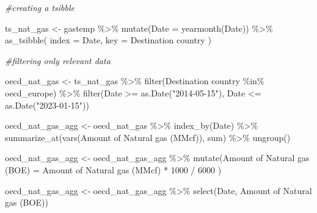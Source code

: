 \documentclass[
]{article}
\newenvironment{Shaded}{\begin{snugshade}}{\end{snugshade}}
\newcommand{\AttributeTok}[1]{\textcolor[rgb]{0.77,0.63,0.00}{#1}}
\newcommand{\CommentTok}[1]{\textcolor[rgb]{0.56,0.35,0.01}{\textit{#1}}}
\newcommand{\DecValTok}[1]{\textcolor[rgb]{0.00,0.00,0.81}{#1}}
\newcommand{\FunctionTok}[1]{\textcolor[rgb]{0.00,0.00,0.00}{#1}}
\newcommand{\NormalTok}[1]{#1}
\newcommand{\OtherTok}[1]{\textcolor[rgb]{0.56,0.35,0.01}{#1}}
\newcommand{\SpecialCharTok}[1]{\textcolor[rgb]{0.00,0.00,0.00}{#1}}
\newcommand{\StringTok}[1]{\textcolor[rgb]{0.31,0.60,0.02}{#1}}
\begin{document}
\begin{Shaded}
\begin{Highlighting}[]
\CommentTok{\#creating a tsibble}

\NormalTok{ts\_nat\_gas }\OtherTok{\textless{}{-}}\NormalTok{ gastemp }\SpecialCharTok{\%\textgreater{}\%}
  \FunctionTok{mutate}\NormalTok{(}\AttributeTok{Date =} \FunctionTok{yearmonth}\NormalTok{(Date)) }\SpecialCharTok{\%\textgreater{}\%} 
  \FunctionTok{as\_tsibble}\NormalTok{(}
    \AttributeTok{index =}\NormalTok{ Date,}
    \AttributeTok{key =} \StringTok{\textasciigrave{}}\AttributeTok{Destination country}\StringTok{\textasciigrave{}}
\NormalTok{  )}

\CommentTok{\#filtering only relevant data}

\NormalTok{oecd\_nat\_gas }\OtherTok{\textless{}{-}}\NormalTok{ ts\_nat\_gas }\SpecialCharTok{\%\textgreater{}\%}
  \FunctionTok{filter}\NormalTok{(}\StringTok{\textasciigrave{}}\AttributeTok{Destination country}\StringTok{\textasciigrave{}} \SpecialCharTok{\%in\%}\NormalTok{ oecd\_europe) }\SpecialCharTok{\%\textgreater{}\%} 
  \FunctionTok{filter}\NormalTok{(Date }\SpecialCharTok{\textgreater{}=} \FunctionTok{as.Date}\NormalTok{(}\StringTok{"2014{-}05{-}15"}\NormalTok{), Date }\SpecialCharTok{\textless{}=} \FunctionTok{as.Date}\NormalTok{(}\StringTok{"2023{-}01{-}15"}\NormalTok{))}

\NormalTok{oecd\_nat\_gas\_agg }\OtherTok{\textless{}{-}}\NormalTok{ oecd\_nat\_gas }\SpecialCharTok{\%\textgreater{}\%}
  \FunctionTok{index\_by}\NormalTok{(Date) }\SpecialCharTok{\%\textgreater{}\%}
  \FunctionTok{summarize\_at}\NormalTok{(}\FunctionTok{vars}\NormalTok{(}\StringTok{\textasciigrave{}}\AttributeTok{Amount of Natural gas (MMcf)}\StringTok{\textasciigrave{}}\NormalTok{), sum) }\SpecialCharTok{\%\textgreater{}\%}
  \FunctionTok{ungroup}\NormalTok{()}

\NormalTok{oecd\_nat\_gas\_agg }\OtherTok{\textless{}{-}}\NormalTok{ oecd\_nat\_gas\_agg }\SpecialCharTok{\%\textgreater{}\%} 
  \FunctionTok{mutate}\NormalTok{(}\StringTok{\textasciigrave{}}\AttributeTok{Amount of Natural gas (BOE)}\StringTok{\textasciigrave{}} \OtherTok{=} \StringTok{\textasciigrave{}}\AttributeTok{Amount of Natural gas (MMcf)}\StringTok{\textasciigrave{}} \SpecialCharTok{*} \DecValTok{1000} \SpecialCharTok{/} \DecValTok{6000}\NormalTok{ )}

\NormalTok{oecd\_nat\_gas\_agg }\OtherTok{\textless{}{-}}\NormalTok{ oecd\_nat\_gas\_agg }\SpecialCharTok{\%\textgreater{}\%} 
  \FunctionTok{select}\NormalTok{(Date, }\StringTok{\textasciigrave{}}\AttributeTok{Amount of Natural gas (BOE)}\StringTok{\textasciigrave{}}\NormalTok{)}


\end{Highlighting}
\end{Shaded}
\end{document}
